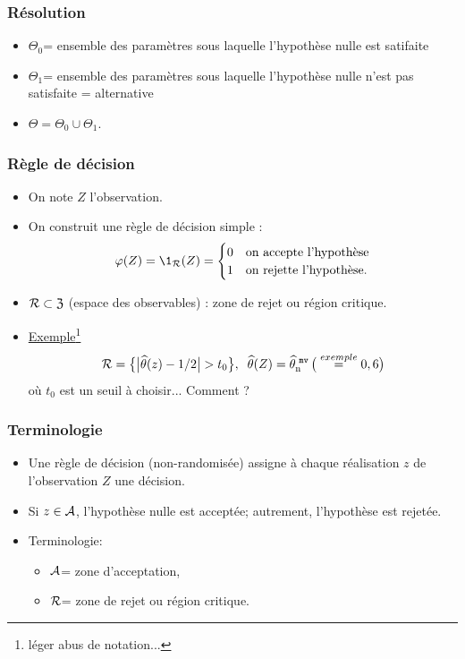 \begin{frame}
\frametitle{Résolution}
\begin{itemize}
\item $\Theta_0$= ensemble des paramètres sous laquelle l'hypothèse nulle est satifaite
\item $\Theta_1$= ensemble des paramètres sous laquelle l'hypothèse nulle n'est pas satisfaite = \alert{alternative}
\item $\Theta= \Theta_0 \cup \Theta_1$.
\end{itemize}
\end{frame}

\begin{frame}
\frametitle{Règle de décision}
\begin{itemize}
\item On note $Z$ l'observation.
\item On \alert{construit} une \alert{règle de décision simple} :
$$\varphi(Z) = \1_{\zreject}(Z) =
\begin{cases}
0 & \text{on accepte l'hypothèse} \\
1 & \text{on rejette l'hypothèse.}
\end{cases}
$$
\item $ \mathcal{R}\subset {\mathfrak Z}$ (espace des observables) : \alert{zone de rejet} ou \alert{région critique}.
\item \underline{Exemple}\footnote{léger abus de notation...}
$$\mathcal{R} = \big\{\big|\widehat {\theta}(z)-1/2\big| > t_0\big\},\;\;\widehat {\theta}(Z) = \operatorname{\widehat \theta_n^{\,\,{\tt mv}}} \big(\stackrel{exemple}{=} 0,6\big)$$
où $t_0$ est un seuil à choisir... \alert{Comment ?}
\end{itemize}
\end{frame}

\begin{frame}
\frametitle{Terminologie}
\begin{itemize}
\item Une \alert{règle de décision} (non-randomisée) assigne à chaque réalisation $z$ de l'observation $Z$ une \alert{décision}.
\item Si $z \in \mathcal{A}$, l'hypothèse nulle est \alert{acceptée}; autrement, l'hypothèse est rejetée.
\item \alert{Terminologie}:
\begin{itemize}
\item $\mathcal{A}$= \alert{zone d'acceptation},
\item $\mathcal{R}$= \alert{zone de rejet} ou \alert{région critique}.
\end{itemize}
\end{itemize}
\end{frame}

